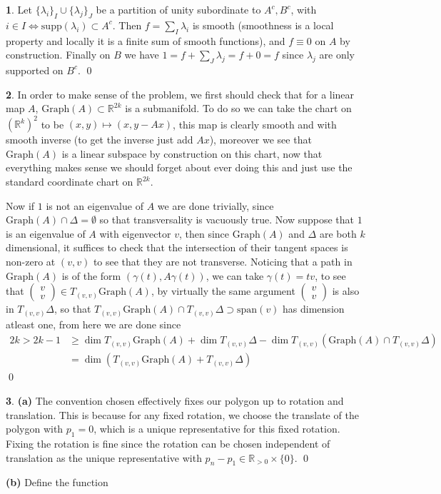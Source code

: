 \documentclass[10.5pt]{article}
\theoremstyle{definition}
\newtheorem{pb}{}
\newcommand{\set}[1]{\{#1\}}
\begin{document}
    \begin{pb}
        Let \(\set{\lambda_i}_I\cup\set{\lambda_j}_J\) be a partition of unity subordinate to \(A^c, B^c\), with \(i \in I \iff \text{supp}(\lambda_i) \subset A^c\). Then \(f = \sum_I \lambda_i\) is smooth (smoothness is a local property and locally it is a finite sum of smooth functions), and \(f \equiv 0\) on \(A\) by construction. Finally on \(B\) we have \(1 = f + \sum_J \lambda_j = f + 0 = f\) since \(\lambda_j\) are only supported on \(B^c\). \qed 
    \end{pb}
    \begin{pb}
        In order to make sense of the problem, we first should check that for a linear map \(A\), \(\text{Graph}(A) \subset \mathbb{R}^{2k}\) is a submanifold. To do so we can take the chart on \((\mathbb{R}^k)^2\) to be \((x,y) \mapsto (x,y - Ax)\), this map is clearly smooth and with smooth inverse (to get the inverse just add \(Ax\)), moreover we see that \(\text{Graph}(A)\) is a linear subspace by construction on this chart, now that everything makes sense we should forget about ever doing this and just use the standard coordinate chart on \(\mathbb{R}^{2k}\).

        Now if \(1\) is not an eigenvalue of \(A\) we are done trivially, since \(\text{Graph}(A) \cap \Delta = \emptyset\) so that transversality is vacuously true. Now suppose that \(1\) is an eigenvalue of \(A\) with eigenvector \(v\), then since \(\text{Graph}(A)\) and \(\Delta\) are both \(k\) dimensional, it suffices to check that the intersection of their tangent spaces is non-zero at \((v,v)\) to see that they are not transverse. Noticing that a path in \(\text{Graph}(A)\) is of the form \((\gamma(t),A\gamma(t))\), we can take \(\gamma(t) = tv\), to see that \(\begin{pmatrix} v \\ v \end{pmatrix} \in T_{(v,v)}\text{Graph}(A)\), by virtually the same argument \(\begin{pmatrix} v \\ v \end{pmatrix}\) is also in \(T_{(v,v)}\Delta\), so that \(T_{(v,v)}\text{Graph}(A) \cap T_{(v,v)}\Delta \supset \text{span}(v)\) has dimension atleast one, from here we are done since
        \begin{align*}
            2k > 2k-1 &\geq \dim T_{(v,v)}\text{Graph}(A) + \dim T_{(v,v)}\Delta - \dim T_{(v,v)}(\text{Graph}(A) \cap T_{(v,v)}\Delta) \\ &= \dim (T_{(v,v)}\text{Graph}(A) +  T_{(v,v)}\Delta)
        \end{align*} \qed
    \end{pb}
    \begin{pb}
        \textbf{(a)} The convention chosen effectively fixes our polygon up to rotation and translation. This is because for any fixed rotation, we choose the translate of the polygon with \(p_1 = 0\), which is a unique representative for this fixed rotation. Fixing the rotation is fine since the rotation can be chosen independent of translation as the unique representative with \(p_n - p_1 \in \mathbb{R}_{>0} \times \set{0}\). \qed

        \textbf{(b)} Define the function
    \end{pb}
\end{document}

